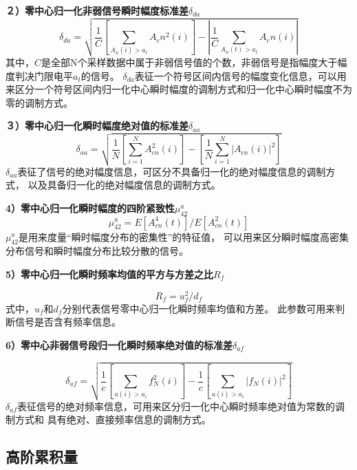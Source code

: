 \textbf{２）零中心归一化非弱信号瞬时幅度标准差$\delta_{da}$}
\begin{equation}
\label{eqt_4_3}
\delta_{da}=\sqrt{\frac{1}{C}\left[\sum_{A_n(i)>a_t} A_cn^2(i)\right]
	- \left|\frac{1}{C} \sum_{A_n(t)>a_t} A_cn(i)\right|}
\end{equation}
其中，$C$是全部N个采样数据中属于非弱信号值的个数，非弱信号是指幅度大于幅度判决门限电平$a_t$的信号。
$\delta_{da}$表征一个符号区间内信号的幅度变化信息，可以用来区分一个符号区间内归一化中心瞬时幅度的调制方式和归一化中心瞬时幅度不为零的调制方式。


\textbf{３）零中心归一化瞬时幅度绝对值的标准差$\delta_{aa}$}
\begin{equation}
\label{eqt_4_4}
\delta_{aa} = \sqrt{\frac{1}{N}\left[\sum_{i=1}^{N} A_{cn}^2(i)\right]
	- \left[\frac{1}{N} \sum_{i=1}^{N} \left|A_{cn}(i)\right|^2\right]}
\end{equation}
$\delta_{aa}$表征了信号的绝对幅度信息，可区分不具备归一化的绝对幅度信息的调制方式，
以及具备归一化的绝对幅度信息的调制方式。

\textbf{4）零中心归一化瞬时幅度的四阶紧致性$\mu_{42}^{a}$}
\begin{equation}
\label{eqt_4_5}
\mu_{42}^{a} = E\left[A_{cn}^{4} (t) \right] / E\left[A_{cn}^{2} (t) \right]
\end{equation}
$\mu_{42}^{a}$是用来度量“瞬时幅度分布的密集性”的特征值，
可以用来区分瞬时幅度高密集分布信号和瞬时幅度分布比较分散的信号。


\textbf{5）零中心归一化瞬时频率均值的平方与方差之比$R_f$}\par
\begin{equation}
\label{eqt_4_6}
R_f = u_f^2 / d_f
\end{equation}
式中，$u_f$和$d_f$分别代表信号零中心归一化瞬时频率均值和方差。
此参数可用来判断信号是否含有频率信息。


\textbf{6）零中心非弱信号段归一化瞬时频率绝对值的标准差$\delta_{af}$}

\begin{equation}
\label{eqt_4_7}
\delta_{af} = \sqrt{\frac{1}{c}\left[\sum_{a(i)>a_i} f_N^2(i)\right]
	- \frac{1}{c}\left[\sum_{a(i)>a_i} \left|f_N(i)\right|^2\right]}
\end{equation}
$\delta_{af}$表征信号的绝对频率信息，可用来区分归一化中心瞬时频率绝对值为常数的调制方式和
具有绝对、直接频率信息的调制方式。

\subsection{高阶累积量}

